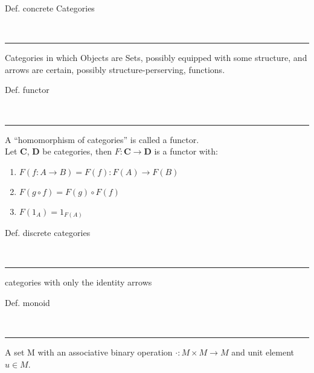 \begin{note}
  \begin{field}
    Def. concrete Categories
  \end{field} \\
  \noindent\rule[0.5ex]{\linewidth}{1pt}
  \begin{field}
    Categories in which Objects are Sets, possibly equipped with some structure, and arrows are certain, possibly structure-perserving, functions.
  \end{field}
\end{note}

\begin{note}
  \begin{field}
    Def. functor
  \end{field} \\
  \noindent\rule[0.5ex]{\linewidth}{1pt}
  \begin{field}
    A ``homomorphism of categories'' is called a functor.\\
    Let \textbf{C}, \textbf{D} be categories, then $F: \textbf{C} \rightarrow \textbf{D}$ is a functor with:\\
    \begin{enumerate}
      \item $F(f: A \rightarrow B) = F(f): F(A) \rightarrow F(B)$
      \item $F(g\circ f) = F(g)\circ F(f)$
      \item $F(1_A) = 1_{F(A)}$
    \end{enumerate}
  \end{field}
\end{note}

\begin{note}
  \begin{field}
    Def. discrete categories
  \end{field} \\
  \noindent\rule[0.5ex]{\linewidth}{1pt}
  \begin{field}
    categories with only the identity arrows
  \end{field}
\end{note}

\begin{note}
  \begin{field}
    Def. monoid
  \end{field} \\
  \noindent\rule[0.5ex]{\linewidth}{1pt}
  \begin{field}
    A set M with an associative binary operation $\cdot: M\times M \rightarrow M$ and unit element $u\in M$.
  \end{field}
\end{note}

